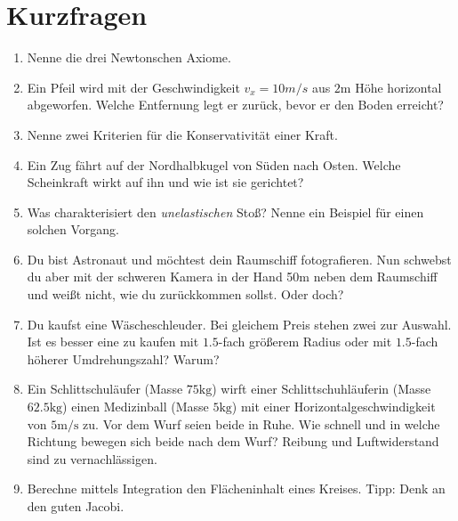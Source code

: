 \section{Kurzfragen}
\begin{enumerate}

  \item Nenne die drei Newtonschen Axiome.
  \item Ein Pfeil wird mit der Geschwindigkeit $v_x = 10 m/s$ aus $2\si{\meter}$ Höhe horizontal abgeworfen. Welche
        Entfernung legt er zurück, bevor er den Boden erreicht?
  \item Nenne zwei Kriterien für die Konservativität einer Kraft.
  \item Ein Zug fährt auf der Nordhalbkugel von Süden nach Osten. Welche Scheinkraft wirkt auf ihn und wie ist sie gerichtet?
  \item Was charakterisiert den \emph{unelastischen} Stoß? Nenne ein Beispiel für einen solchen Vorgang.
  \item Du bist Astronaut und möchtest dein Raumschiff fotografieren. Nun schwebst du aber mit der schweren Kamera in der Hand 50m
        neben dem Raumschiff und weißt nicht, wie du zurückkommen sollst. Oder doch?
  \item Du kaufst eine Wäscheschleuder. Bei gleichem Preis stehen zwei zur Auswahl.  Ist es besser eine zu kaufen mit $1.5$-fach
        größerem Radius oder mit $1.5$-fach höherer Umdrehungszahl? Warum?
  \item Ein Schlittschuläufer (Masse $75\si{\kilo\gram}$) wirft einer Schlittschuhläuferin (Masse $62.5\si{\kilo\gram}$) einen
        Medizinball (Masse $5\si{\kilo\gram}$) mit einer Horizontalgeschwindigkeit von $5\si{\meter\per\second}$ zu. Vor dem Wurf
        seien beide in Ruhe. Wie schnell und in welche Richtung bewegen sich beide nach dem Wurf? Reibung und Luftwiderstand sind
        zu vernachlässigen.
  \item Berechne mittels Integration den Flächeninhalt eines Kreises. Tipp: Denk an den guten Jacobi.
\end{enumerate}

\newpage
